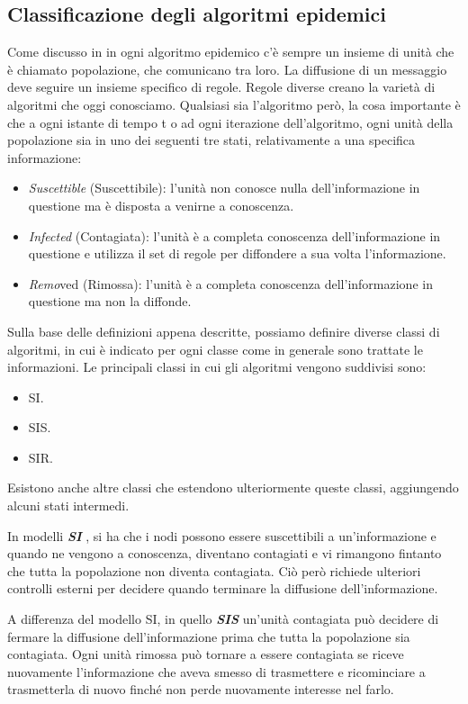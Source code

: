 \subsection{Classificazione degli algoritmi epidemici}
Come discusso in \cite{schindel2004-epidemicAlg} in ogni algoritmo epidemico c'è sempre un insieme di unità che è chiamato popolazione, che comunicano tra loro. La diffusione di un messaggio deve seguire un insieme specifico di regole. Regole diverse creano la varietà di algoritmi che oggi conosciamo. Qualsiasi sia l'algoritmo però, la cosa importante è che a ogni istante di tempo t o ad ogni iterazione dell'algoritmo, ogni unità della popolazione sia in uno dei seguenti tre stati, relativamente a una specifica informazione:
\begin{itemize}
		\item \textit{Suscettible} (Suscettibile): l'unità non conosce nulla dell'informazione in questione ma è disposta a venirne a conoscenza.
		\item \textit{Infected} (Contagiata): l'unità è a completa conoscenza dell'informazione in questione e utilizza il set di regole per diffondere a sua volta l'informazione.
		\item \textit{Remo}ved (Rimossa): l'unità è a completa conoscenza dell'informazione in questione ma non la diffonde.
\end{itemize}
Sulla base delle definizioni appena descritte, possiamo definire diverse classi di algoritmi, in cui è indicato per ogni classe come in generale sono trattate le informazioni. Le principali classi in cui gli algoritmi vengono suddivisi sono:
\begin{itemize}
	\item \acf{SI}.
	\item \acf{SIS}.
	\item \acf{SIR}.
	
\end{itemize}
Esistono anche altre classi che estendono ulteriormente queste classi, aggiungendo alcuni stati intermedi.

In modelli \textbf{\textit{\acf{SI}}} \cite{schindel2004-epidemicAlg}, si ha che i nodi possono essere suscettibili a un'informazione e quando ne vengono a conoscenza, diventano contagiati e vi rimangono fintanto che tutta la popolazione non diventa contagiata. Ciò però richiede ulteriori controlli esterni per decidere quando terminare la diffusione dell'informazione.

A differenza del modello \acs{SI}, in quello \textbf{\textit{\acf{SIS}}} \cite{schindel2004-epidemicAlg} un'unità contagiata può decidere di fermare la diffusione dell'informazione prima che tutta la popolazione sia contagiata. Ogni unità rimossa può tornare a essere contagiata se riceve nuovamente l'informazione che aveva smesso di trasmettere e ricominciare a trasmetterla di nuovo finché non perde nuovamente interesse nel farlo.

